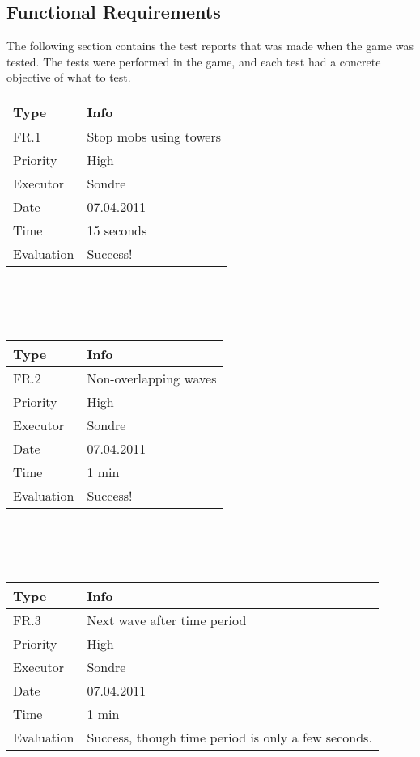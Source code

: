 \subsection{Functional Requirements}
The following section contains the test reports that was made when the game was tested. The tests were performed in the game, and each test had a concrete objective of what to test.

  \begin{tabular}{|l | p{10cm} | }
	\hline	
	\textbf{Type} & \textbf{Info} \\
	\hline
	FR.1 & Stop mobs using towers \\
	\hline
	Priority & High  \\
	\hline
	Executor & Sondre  \\
	\hline
	Date & 07.04.2011 \\
	\hline
	Time & 15 seconds \\
	\hline
	Evaluation & Success! \\
	\hline
  \end{tabular}
  \\
  \\
  \\  
  \begin{tabular}{|l | p{10cm} | }
	\hline	
	\textbf{Type} & \textbf{Info} \\
	\hline
	FR.2 & Non-overlapping waves \\
	\hline
	Priority & High  \\
	\hline
	Executor & Sondre  \\
	\hline
	Date & 07.04.2011 \\
	\hline
	Time & 1 min \\
	\hline
	Evaluation & Success! \\
	\hline
  \end{tabular}
  \\
  \\
  \\
  \begin{tabular}{|l |p{10cm} |}
	\hline	
	\textbf{Type} & \textbf{Info} \\
	\hline
	FR.3 & Next wave after time period  \\
	\hline
	Priority & High  \\
	\hline
	Executor & Sondre  \\
	\hline
	Date & 07.04.2011 \\
	\hline
	Time & 1 min \\
	\hline
	Evaluation & Success, though time period is only a few seconds. \\
	\hline
  \end{tabular}
